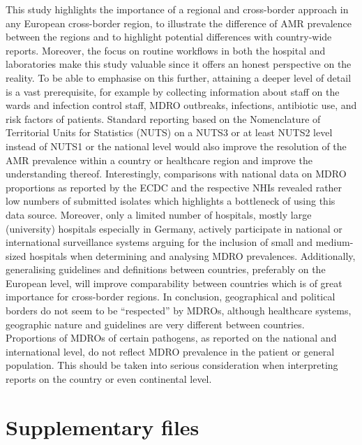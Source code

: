 \documentclass[
]{book}
\begin{document}
This study highlights the importance of a regional and cross-border approach in any European cross-border region, to illustrate the difference of AMR prevalence between the regions and to highlight potential differences with country-wide reports. Moreover, the focus on routine workflows in both the hospital and laboratories make this study valuable since it offers an honest perspective on the reality. To be able to emphasise on this further, attaining a deeper level of detail is a vast prerequisite, for example by collecting information about staff on the wards and infection control staff, MDRO outbreaks, infections, antibiotic use, and risk factors of patients. Standard reporting based on the Nomenclature of Territorial Units for Statistics (NUTS) on a NUTS3 or at least NUTS2 level instead of NUTS1 or the national level would also improve the resolution of the AMR prevalence within a country or healthcare region and improve the understanding thereof. Interestingly, comparisons with national data on MDRO proportions as reported by the ECDC and the respective NHIs revealed rather low numbers of submitted isolates which highlights a bottleneck of using this data source. Moreover, only a limited number of hospitals, mostly large (university) hospitals especially in Germany, actively participate in national or international surveillance systems arguing for the inclusion of small and medium-sized hospitals when determining and analysing MDRO prevalences. Additionally, generalising guidelines and definitions between countries, preferably on the European level, will improve comparability between countries which is of great importance for cross-border regions. In conclusion, geographical and political borders do not seem to be ``respected'' by MDROs, although healthcare systems, geographic nature and guidelines are very different between countries. Proportions of MDROs of certain pathogens, as reported on the national and international level, do not reflect MDRO prevalence in the patient or general population. This should be taken into serious consideration when interpreting reports on the country or even continental level.

\hypertarget{supplementary-files}{%
\section*{Supplementary files}\label{supplementary-files}}
\end{document}
